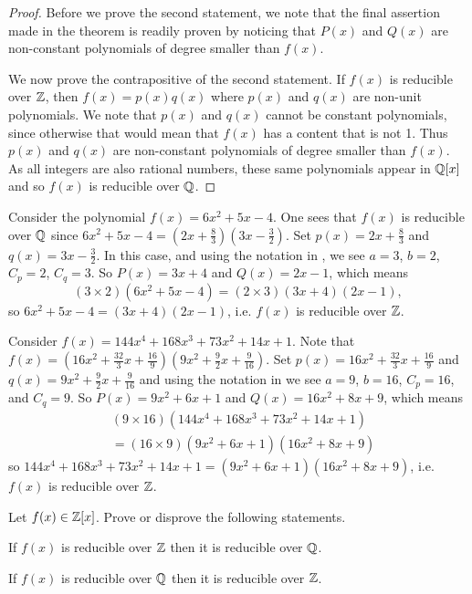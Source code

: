 \begin{proof}
    Before we prove the second statement, we note that the final assertion made in the theorem is readily proven by noticing that $P(x)$ and $Q(x)$ are non-constant polynomials of degree smaller than $f(x)$.

    We now prove the contrapositive of the second statement. If $f(x)$ is reducible over $\mathbb{Z}$, then $f(x) = p(x)q(x)$ where $p(x)$ and $q(x)$ are non-unit polynomials. We note that $p(x)$ and $q(x)$ cannot be constant polynomials, since otherwise that would mean that $f(x)$ has a content that is not 1. Thus $p(x)$ and $q(x)$ are non-constant polynomials of degree smaller than $f(x)$. As all integers are also rational numbers, these same polynomials appear in $\mathbb{Q}[x]$ and so $f(x)$ is reducible over $\mathbb{Q}$.
\end{proof}

\begin{example}
    Consider the polynomial $f(x) = 6x^2 + 5x - 4$. One sees that $f(x)$ is reducible over $\mathbb{Q}$ since $6x^2 + 5x - 4 = \left(2x + \frac83\right)\left(3x - \frac32\right)$. Set $p(x) = 2x + \frac83$ and $q(x) = 3x - \frac32$. In this case, and using the notation in , we see $a = 3$, $b = 2$, $C_p = 2$, $C_q = 3$. So $P(x) = 3x + 4$ and $Q(x) = 2x - 1$, which means
    \[
        (3\times2)(6x^2 + 5x - 4) = (2\times3)(3x+4)(2x-1),
    \]
    so $6x^2 + 5x - 4 = (3x+4)(2x-1)$, i.e. $f(x)$ is reducible over $\mathbb{Z}$.
\end{example}

\begin{example}
    Consider $f(x) = 144x^4 + 168x^3 + 73x^2 + 14x + 1$. Note that $f(x) = \left(16x^2 + \frac{32}3x + \frac{16}9\right)\left(9x^2 + \frac92x + \frac9{16}\right)$. Set $p(x) = 16x^2 + \frac{32}3x + \frac{16}9$ and $q(x) = 9x^2 + \frac92x + \frac9{16}$ and using the notation in  we see $a = 9$, $b = 16$, $C_p = 16$, and $C_q = 9$. So $P(x) = 9x^2+6x+1$ and $Q(x) = 16x^2 + 8x + 9$, which means
    \begin{align*}
        &(9 \times 16)\left(144x^4 + 168x^3 + 73x^2 + 14x + 1\right)\\
        &= (16 \times 9)(9x^2+6x+1)(16x^2 + 8x + 9)
    \end{align*}
    so $144x^4 + 168x^3 + 73x^2 + 14x + 1 = (9x^2+6x+1)(16x^2 + 8x + 9)$, i.e. $f(x)$ is reducible over $\mathbb{Z}$.
\end{example}

\begin{exercise}
    Let $f(x) \in \mathbb{Z}[x]$. Prove or disprove the following statements.
    \begin{partquestions}{\alph*}
        \item If $f(x)$ is reducible over $\mathbb{Z}$ then it is reducible over $\mathbb{Q}$.
        \item If $f(x)$ is reducible over $\mathbb{Q}$ then it is reducible over $\mathbb{Z}$.
    \end{partquestions}
\end{exercise}

